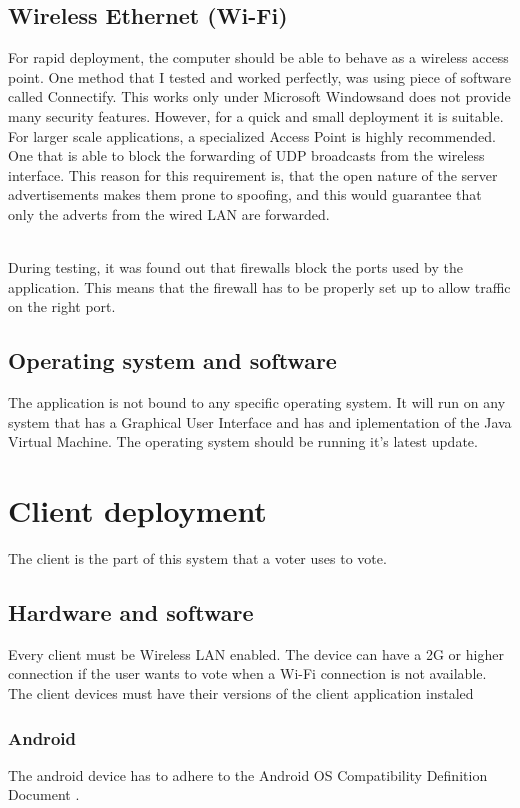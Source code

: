 \documentclass[11pt,twoside,a4paper]{book}
\begin{document}
\subsection{Wireless Ethernet (Wi-Fi)}
For rapid deployment, the computer should be able to behave as a wireless access point. One method that I tested and worked perfectly, was using piece of software called Connectify. This works only under Microsoft \textregistered Windows\textregistered and does not provide many security features. However, for a quick and small deployment it is suitable. \\
For larger scale applications, a specialized Access Point is highly recommended. One that is able to block  the forwarding of UDP broadcasts from the wireless interface. This reason for this requirement is, that the open nature of the server advertisements makes them prone to spoofing, and this would guarantee that only the adverts from the wired LAN are forwarded.  

\\

During testing, it was found out that firewalls block the ports used by the application. This means that the firewall has to be properly set up to allow traffic on the right port.
\\
\subsection{Operating system and software}
The application is not bound to any specific operating system. It will run on any system that has a Graphical User Interface and has and iplementation of the Java Virtual Machine. The operating system should be running it's latest update.

\section{Client deployment}
The client is the part of this system that a voter uses to vote.
\subsection{Hardware and software}
Every client must be Wireless LAN enabled. The device can have a 2G or higher connection if the user wants to vote when a Wi-Fi connection is not available. The client devices must have their versions of the client application instaled
\subsubsection{Android}
The android device has to adhere to the Android OS Compatibility Definition Document \cite{androCompatDef}.
\end{document}

